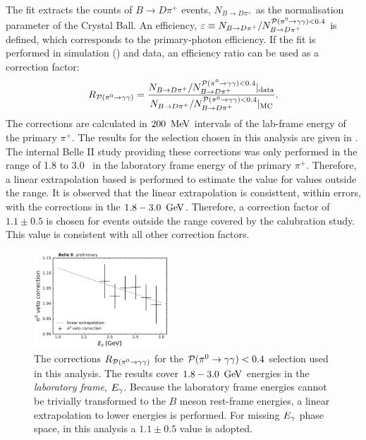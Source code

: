 The fit extracts the counts of $B\to D\pi^+$ events, $N_{B\to D\pi^+}$ as the normalisation parameter of the Crystal Ball.
An efficiency, $\varepsilon\equiv N_{B\rightarrow D\pi^+}/N^{{\mathcal{P}(\pi^0\rightarrow\gamma\gamma)}<0.4}_{B\rightarrow D\pi^+}$ is defined, which corresponds to the primary-photon efficiency.
If the fit is performed in simulation (\MC) and data, an efficiency ratio can be used as a correction factor:
\begin{equation}\label{eq:piveto_correction}
    R_{{\mathcal{P}(\pi^0\rightarrow\gamma\gamma)}} = \frac{N_{B\rightarrow D\pi^+}/N^{{\mathcal{P}(\pi^0\rightarrow\gamma\gamma)}<0.4}_{B\rightarrow D\pi^+}|_{\mathrm{data}}}{N_{B\rightarrow D\pi^+}/N^{{\mathcal{P}(\pi^0\rightarrow\gamma\gamma)}<0.4}_{B\rightarrow D\pi^+}|_{\mathrm{MC}}}.
\end{equation}
The corrections are calculated in $200~\mathrm{\,Me\kern -0.1em V}$ intervals of the lab-frame energy of the primary $\pi^+$.
The results for the selection chosen in this analysis are given in .
The internal Belle II study providing these corrections was only performed in the range of 1.8 to 3.0 ~\gev in the laboratory frame energy of the primary $\pi^+$.
Therefore, a linear extrapolation based is performed to estimate the value for values outside the range.
It is observed that the linear extrapolation is consisttent, within errors, with the corrections in the $1.8-3.0~\mathrm{\,Ge\kern -0.1em V}$.
Therefore, a correction factor of $1.1\pm0.5$ is chosen for events outside the range covered by the calubration study.
This value is consistent with all other correction factors.
\begin{figure}[htbp!]
    \centering
    \includegraphics[width=0.45\textwidth]{figures/data_sim_corrections/pi0veto_corrections.pdf}
    \caption{\label{fig:piveto_corrections} The corrections $R_{{\mathcal{P}(\pi^0\rightarrow\gamma\gamma)}}$ for the ${\mathcal{P}(\pi^0\rightarrow\gamma\gamma)}<0.4$ selection used in this analysis.
    The results cover $1.8-3.0~\mathrm{\,Ge\kern -0.1em V}$ energies in the \textit{laboratory frame}, ${E_{\gamma}}$.
    Because the laboratory frame energies cannot be trivially transformed to the $B$ meson rest-frame energies, a linear extrapolation to lower energies is performed.
    For missing ${E_{\gamma}}$ phase space, in this analysis a $1.1\pm0.5$ value is adopted.
    }
\end{figure}

